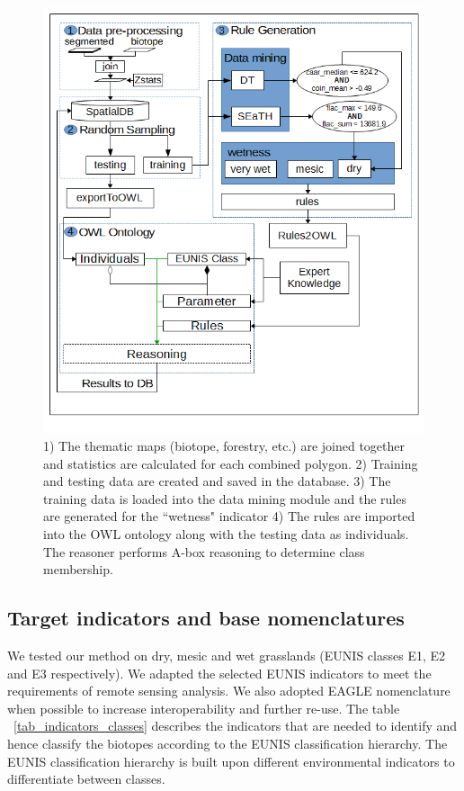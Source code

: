 \documentclass[authoryear, review,12pt,number]{elsarticle}
\begin{document}
\begin{figure}
\includegraphics[width=1\linewidth]{diagrams/another_workflow_diagram_large.png}
\caption
    {
        1) The thematic maps (biotope, forestry, etc.) are joined together and
        statistics are calculated for each combined polygon.
        2) Training and testing data are created and saved in the database.
        3) The training data is loaded into the data mining module and the
        rules are generated for the ``wetness" indicator
        4) The rules are imported into the OWL ontology along with the testing
        data as individuals. The reasoner performs A-box reasoning to determine
        class membership.
    } 
\label{fig_full_workflow}
\end{figure}
\subsection{Target indicators and base nomenclatures}
We tested our method on dry, mesic and wet grasslands (EUNIS classes E1, E2 and
E3 respectively). We adapted the selected EUNIS indicators to meet the
requirements of remote sensing analysis. We also adopted EAGLE nomenclature when
possible to increase interoperability and further re-use. The table
~\ref{tab_indicators_classes} describes the indicators that are needed to
identify and hence classify the biotopes according to the EUNIS classification
hierarchy. The EUNIS classification hierarchy is built upon different
environmental indicators to differentiate between classes. 
\end{document}
